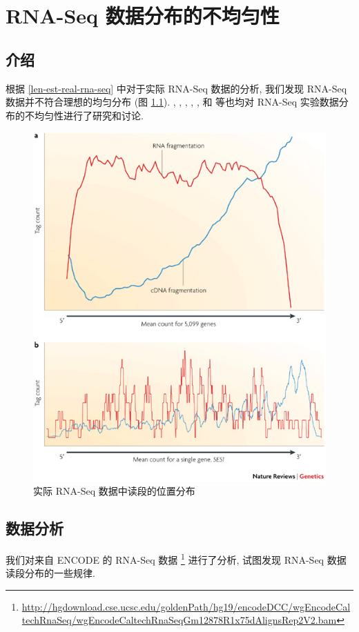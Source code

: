 \chapter{RNA-Seq 数据分布的不均匀性}
\label{chap-rna-seq-nonunif}

\section{介绍}
根据 \ref{len-est-real-rna-seq} 中对于实际 RNA-Seq 数据的分析, 
我们发现 RNA-Seq 数据并不符合理想的均匀分布 (图 \ref{rna-seq-bias}). 
, , 
, , , 和
 等也均对 RNA-Seq 实验数据分布的不均匀性进行了研究和讨论. 

\begin{figure}[!t]
\centering
\includegraphics[width=\textwidth]{figures/nonunif/rna-seq-bias.jpg}
\caption{实际 RNA-Seq 数据中读段的位置分布 \cite{wang2009rna}}
\label{rna-seq-bias}
\end{figure}

\section{数据分析}
我们对来自 ENCODE \cite{encode} 的 RNA-Seq 数据 
\footnote{\url{http://hgdownload.cse.ucsc.edu/goldenPath/hg19/encodeDCC/wgEncodeCaltechRnaSeq/wgEncodeCaltechRnaSeqGm12878R1x75dAlignsRep2V2.bam}} 
进行了分析, 试图发现 RNA-Seq 数据读段分布的一些规律. 

